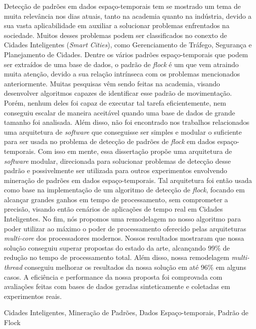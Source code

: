 Detecção de padrões em dados espaço-temporais tem se mostrado um tema de muita relevância nos dias atuais, tanto na
academia quanto na indústria, devido a sua vasta aplicabilidade em auxiliar a solucionar problemas enfrentados na
sociedade. Muitos desses problemas podem ser classificados no conexto de Cidades Inteligentes (\textit{Smart Cities}),
como Gerenciamento de Tráfego, Segurança e Planejamento de Cidades. Dentre os vários padrões espaço-temporais que podem
ser extraídos de uma base de dados, o padrão de \textit{flock} é um que vem atraindo muita atenção, devido a sua relação
intrínseca com os problemas mencionados anteriormente. Muitas pesquisas vêm sendo feitas na academia, visando
desenvolver algoritmos capazes de identificar esse padrão de movimentação. Porém, nenhum deles foi capaz de executar tal
tarefa eficientemente, nem conseguiu escalar de maneira aceitável quando uma base de dados de grande tamanho foi
analisada. Além disso, não foi encontrado nos trabalhos relacionados uma arquitetura de \textit{software} que
conseguisse ser simples e modular o suficiente para ser usada no problema de detecção de padrões de \textit{flock} em
dados espaço-temporais. Com isso em mente, essa dissertação propõe uma arquitetura de \textit{software} modular,
direcionada para solucionar problemas de detecção desse padrão e possivelmente ser utilizada para outros experimentos
envolvendo mineração de padrões em dados espaço-temporais. Tal arquitetura foi então usada como base na implementação de
um algoritmo de detecção de \textit{flock}, focando em alcançar grandes ganhos em tempo de processamento, sem
comprometer a precisão, visando então cenários de aplicações de tempo real em Cidades Inteligentes.  No fim, nós
propomos uma remodelagem no nosso algoritmo para poder utilizar ao máximo o poder de processamento oferecido pelas
arquiteturas \textit{multi-core} dos processadores modernos. Nossos resultados mostraram que nossa solução conseguiu
superar propostas do estado da arte, alcançando 99\% de redução no tempo de processamento total. Além disso, nossa
remodelagem \textit{multi-thread} conseguiu melhorar os resultados da nossa solução em até 96\% em alguns casos. A
eficiência e performance da nossa proposta foi comprovada com avaliações feitas com bases de dados geradas
sinteticamente e coletadas em experimentos reais.

\begin{keywords}
Cidades Inteligentes, Mineração de Padrões, Dados Espaço-temporais, Padrão de Flock
\end{keywords}
